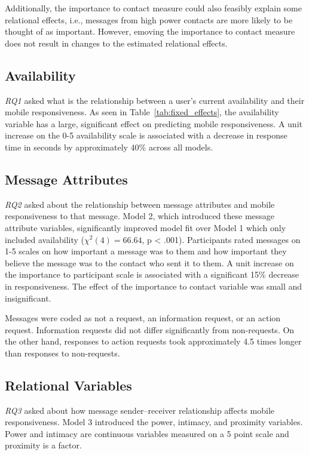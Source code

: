 \documentclass[12pt]{nuthesis}	%
\begin{document}
Additionally, the importance to contact measure could also feasibly explain some relational effects, i.e., messages from high power contacts are more likely to be thought of as important. However, emoving the importance to contact measure does not result in changes to the estimated relational effects.


\subsection{Availability}

\textit{RQ1} asked what is the relationship between a user's current availability and their mobile responsiveness. As seen in Table~\ref{tab:fixed_effects}, the availability variable has a large, significant effect on predicting mobile responsiveness.  A unit increase on the 0-5 availability scale is associated with a decrease in response time in seconds by approximately 40\% across all models.

\subsection{Message Attributes}

\textit{RQ2} asked about the relationship between message attributes and mobile responsiveness to that message. Model 2, which introduced these message attribute variables, significantly improved model fit over Model 1 which only included availability ($\chi^2(4) = 66.64$, p < .001). Participants rated messages on 1-5 scales on how important a message was to them and how important they believe the message was to the contact who sent it to them. A unit increase on the importance to participant scale is associated with a significant 15\% decrease in responsiveness. The effect of the importance to contact variable was small and insignificant.

Messages were coded as not a request, an information request, or an action request. Information requests did not differ significantly from non-requests. On the other hand, responses to action requests took approximately 4.5 times longer than responses to non-requests.


\subsection{Relational Variables}

\textit{RQ3} asked about how message sender--receiver relationship affects mobile responsiveness. Model 3 introduced the power, intimacy, and proximity variables. Power and intimacy are continuous variables measured on a 5 point scale and proximity is a factor.
\end{document}
